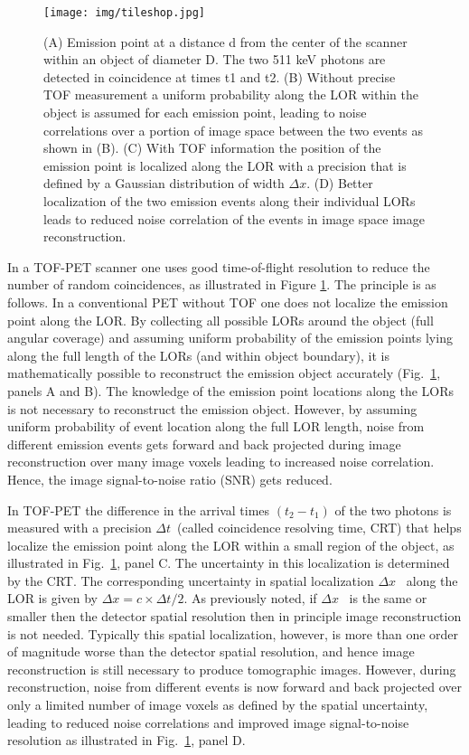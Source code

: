 \begin{figure}[!bhtp]
	\centering
	\texttt{[image: img/tileshop.jpg]}
	\caption{\label{fig.tile} (A) Emission point at a distance d from the center of the scanner within an object of diameter D. The two 511 keV photons are detected in coincidence at times t1 and t2. (B) Without precise TOF measurement a uniform probability along the LOR within the object is assumed for each emission point, leading to noise correlations over a portion of image space between the two events as shown in (B). (C) With TOF information the position of the emission point is localized along the LOR with a precision that is defined by a Gaussian distribution of width $\Delta x$. (D) Better localization of the two emission events along their individual LORs leads to reduced noise correlation of the events in image space image reconstruction. }
\end{figure}

In a TOF-PET scanner one uses good time-of-flight resolution to reduce the number of random coincidences, as illustrated in Figure \ref{fig.tile}. The principle is as follows. In a conventional PET without TOF one does not localize the emission point along the LOR. By collecting all possible LORs around the object (full angular coverage) and assuming uniform probability of the emission points lying along the full length of the LORs (and within object boundary), it is mathematically possible to reconstruct the emission object accurately (Fig.~\ref{fig.tile}, panels A and B). The knowledge of the emission point locations along the LORs is not necessary to reconstruct the emission object. However, by assuming uniform probability of event location along the full LOR length, noise from different emission events gets forward and back projected during image reconstruction over many image voxels leading to increased noise correlation. Hence, the image signal-to-noise ratio (SNR) gets reduced.

In TOF-PET the difference in the arrival times $(t_2 - t_1)$ of the two photons is measured with a precision $\Delta t$~(called coincidence resolving time, CRT) that helps localize the emission point along the LOR within a small region of the object, as illustrated in  Fig.~\ref{fig.tile}, panel C. The uncertainty in this localization is determined by the CRT. The corresponding uncertainty in spatial localization $\Delta x$~ along the LOR is given by 
$\Delta x=c \times \Delta t/2$. As previously noted, if $\Delta x$~ is the same or smaller then the detector spatial resolution then in principle image reconstruction is not needed. Typically this spatial localization, however, is more than one order of magnitude worse than the detector spatial resolution, and hence image reconstruction is still necessary to produce tomographic images. However, during reconstruction, noise from different events is now forward and back projected over only a limited number of image voxels as defined by the spatial uncertainty, leading to reduced noise correlations and improved image signal-to-noise resolution  as illustrated in  Fig.~\ref{fig.tile}, panel D.


